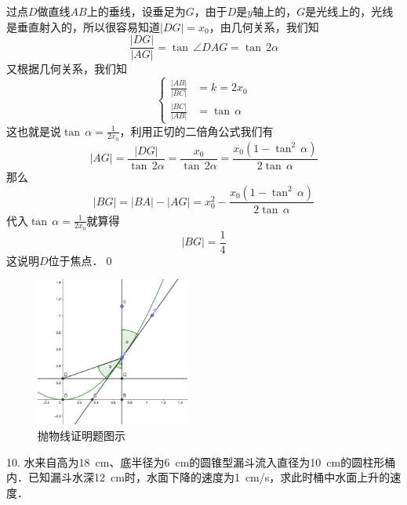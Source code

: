 过点$D$做直线$AB$上的垂线，设垂足为$G$，由于$D$是$y$轴上的，$G$是光线上的，光线是垂直射入的，所以很容易知道$\lvert DG \rvert = x_0$，由几何关系，我们知
\begin{equation}
    \frac{\lvert DG \rvert}{\lvert AG \rvert} = \tan \, \angle DAG = \tan \, 2\alpha
\end{equation}
又根据几何关系，我们知
\begin{equation}
    \begin{cases}
        \displaystyle\frac{\lvert AB \rvert}{\lvert BC \rvert} &= k = 2x_0 \\
        \displaystyle\frac{\lvert BC \rvert}{\lvert AB \rvert} &= \tan \, \alpha
    \end{cases}
\end{equation}
这也就是说$\tan \, \alpha = \displaystyle\frac{1}{2x_0}$，利用正切的二倍角公式我们有
\begin{equation}
    \lvert AG \rvert = \frac{\lvert DG \rvert}{\tan \, 2 \alpha} = \frac{x_0}{\tan \, 2 \alpha} = \frac{x_0(1-\tan^2 \, \alpha)}{2 \tan \, \alpha}
\end{equation}
那么
\begin{equation}
    \lvert BG \rvert = \lvert BA \rvert - \lvert AG \rvert = x_0^2 - \frac{x_0(1-\tan^2 \, \alpha)}{2 \tan \, \alpha}
\end{equation}
代入$\tan \, \alpha = \displaystyle\frac{1}{2x_0}$就算得
\begin{equation}
    \lvert BG \rvert = \frac{1}{4}
\end{equation}
这说明$D$位于焦点．\qed\bigskip

\begin{figure}[H]
    \centering
    \includegraphics[width=0.45\textwidth]{chapter3/light.png}
    \caption{抛物线证明题图示}
\end{figure}

10. 水来自高为\SI{18}{\centi\metre}、底半径为\SI{6}{\centi\metre}的圆锥型漏斗流入直径为\SI{10}{\centi\metre}的圆柱形桶内．已知漏斗水深\SI{12}{\centi\metre}时，水面下降的速度为\SI{1}{\centi\metre/\second}，求此时桶中水面上升的速度．

